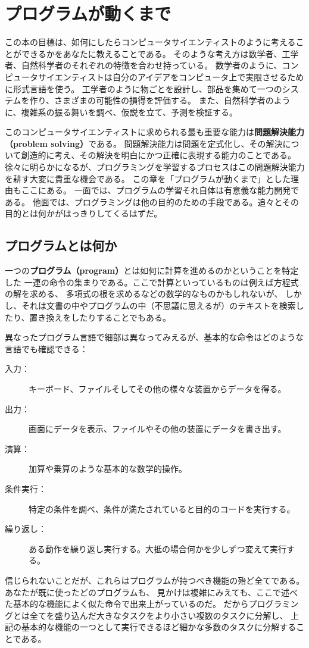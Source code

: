 \documentclass[a4j,12pt,makeidx]{jbook}
\begin{document}
\chapter{プログラムが動くまで}
この本の目標は、如何にしたらコンピュータサイエンティストのように考えることができるかをあなたに教えることである。
そのような考え方は数学者、工学者、自然科学者のそれぞれの特徴を合わせ持っている。
数学者のように、コンピュータサイエンティストは自分のアイデアをコンピュータ上で実限させるために形式言語を使う。
工学者のように物ごとを設計し、部品を集めて一つのシステムを作り、さまざまの可能性の損得を評価する。
また、自然科学者のように、複雑系の振る舞いを調べ、仮説を立て、予測を検証する。\par
このコンピュータサイエンティストに求められる最も重要な能力は{\bf 問題解決能力（problem solving）}である。
問題解決能力は問題を定式化し、その解決について創造的に考え、その解決を明白にかつ正確に表現する能力のことである。
徐々に明らかになるが、プログラミングを学習するプロセスはこの問題解決能力を耕す大変に貴重な機会である。
この章を「プログラムが動くまで」とした理由もここにある。
一面では、プログラムの学習それ自体は有意義な能力開発である。
他面では、プログラミングは他の目的のための手段である。追々とその目的とは何かがはっきりしてくるはずだ。
%
\section{プログラムとは何か}
一つの{\bf プログラム（program）}とは如何に計算を進めるのかということを特定した
一連の命令の集まりである。ここで計算といっているものは例えば方程式の解を求める、
多項式の根を求めるなどの数学的なものかもしれないが、
しかし、それは文書の中やプログラムの中（不思議に思えるが）のテキストを検索したり、置き換えをしたりすることでもある。\par
{}
異なったプログラム言語で細部は異なってみえるが、基本的な命令はどのような言語でも確認できる： 
\begin{description}
\item [入力：] キーボード、ファイルそしてその他の様々な装置からデータを得る。
\item [出力：] 画面にデータを表示、ファイルやその他の装置にデータを書き出す。
\item [演算：] 加算や乗算のような基本的な数学的操作。
\item [条件実行：] 特定の条件を調べ、条件が満たされていると目的のコードを実行する。
\item [繰り返し：] ある動作を繰り返し実行する。大抵の場合何かを少しずつ変えて実行する。
\end{description}
信じられないことだが、これらはプログラムが持つべき機能の殆ど全てである。あなたが既に使ったどのプログラムも、
見かけは複雑にみえても、ここで述べた基本的な機能によく似た命令で出来上がっているのだ。
だからプログラミングとは全てを盛り込んだ大きなタスクをより小さい複数のタスクに分解し、
上記の基本的な機能の一つとして実行できるほど細かな多数のタスクに分解することである。\par
%
\end{document}
